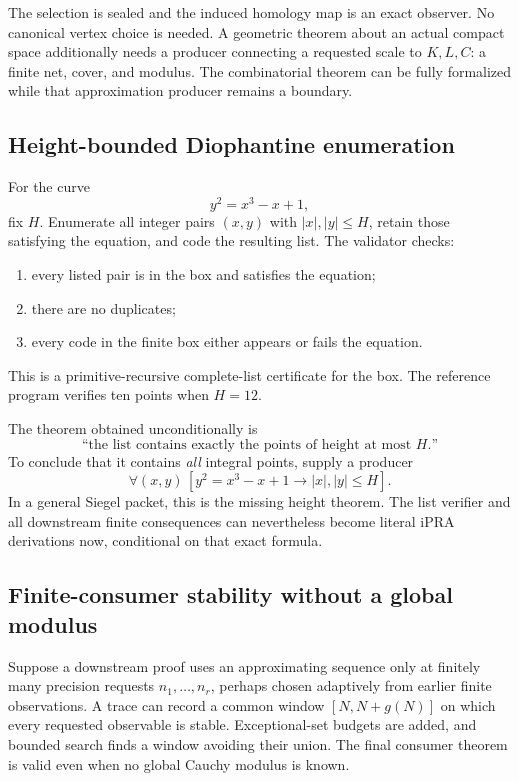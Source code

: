 The selection is sealed and the induced homology map is an exact observer.
No canonical vertex choice is needed.  A geometric theorem about an actual
compact space additionally needs a producer connecting a requested scale to
\(K,L,C\): a finite net, cover, and modulus.  The combinatorial theorem can be
fully formalized while that approximation producer remains a boundary.

\subsection{Height-bounded Diophantine enumeration}

For the curve
\[
       y^2=x^3-x+1,
\]
fix \(H\).  Enumerate all integer pairs \((x,y)\) with
\(|x|,|y|\le H\), retain those satisfying the equation, and code the resulting
list.  The validator checks:
\begin{enumerate}[label=(\alph*)]
\item every listed pair is in the box and satisfies the equation;
\item there are no duplicates;
\item every code in the finite box either appears or fails the equation.
\end{enumerate}
This is a primitive-recursive complete-list certificate for the box.  The
reference program verifies ten points when \(H=12\).

The theorem obtained unconditionally is
\[
  \text{``the list contains exactly the points of height at most }H\text{.''}
\]
To conclude that it contains \emph{all} integral points, supply a producer
\[
  \forall(x,y)\,[y^2=x^3-x+1\to |x|,|y|\le H].
\]
In a general Siegel packet, this is the missing height theorem.  The list
verifier and all downstream finite consequences can nevertheless become
literal iPRA derivations now, conditional on that exact formula.

\subsection{Finite-consumer stability without a global modulus}

Suppose a downstream proof uses an approximating sequence only at finitely many
precision requests \(n_1,\ldots,n_r\), perhaps chosen adaptively from earlier
finite observations.  A trace can record a common window
\([N,N+g(N)]\) on which every requested observable is stable.  Exceptional-set
budgets are added, and bounded search finds a window avoiding their union.
The final consumer theorem is valid even when no global Cauchy modulus is
known.

